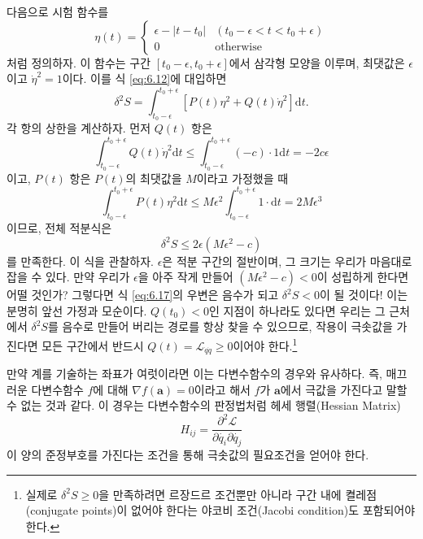 \documentclass[chapter, oneside, b5paper]{oblivoir}
\theoremstyle{plain}
\theoremstyle{definition}
\theoremstyle{remark}
\begin{document}
다음으로 시험 함수를
\begin{equation}
    \eta(t) = \begin{cases}
    \epsilon - |t-t_0| & (t_0 - \epsilon<t<t_0+\epsilon) \\
    0 & \mathrm{otherwise} \end{cases}
\end{equation}
처럼 정의하자. 이 함수는 구간 $[t_0 - \epsilon, t_0 + \epsilon]$에서 삼각형 모양을 이루며, 최댓값은 $\epsilon$이고 $\dot{\eta}^2 = 1$이다. 이를 식 \ref{eq:6.12}에 대입하면
\begin{equation}
    \delta^2 S = \int_{t_0 - \epsilon}^{t_0+\epsilon}[P(t) \eta^2 + Q(t) \dot{\eta}^2] \mathrm{d}t.
\end{equation}
각 항의 상한을 계산하자. 먼저 $Q(t)$ 항은
\begin{equation}
    \int_{t_0 - \epsilon}^{t_0+\epsilon} Q(t)  \dot{\eta}^2 \mathrm{d}t\leq \int_{t_0 - \epsilon}^{t_0+\epsilon} (-c) \cdot 1 \mathrm{d}t = -2c\epsilon
\end{equation}
이고, $P(t)$ 항은 $P(t)$의 최댓값을 $M$이라고 가정했을 때
\begin{equation}
    \int_{t_0 - \epsilon}^{t_0+\epsilon} P(t)  {\eta}^2 \mathrm{d}t\leq M\epsilon^2 \int_{t_0 - \epsilon}^{t_0+\epsilon} 1 \cdot \mathrm{d}t = 2M\epsilon^3
\end{equation}
이므로, 전체 적분식은
\begin{equation}
    \delta^2 S \leq 2\epsilon (M\epsilon^2-c)
    \label{eq:6.17}
\end{equation}
를 만족한다. 이 식을 관찰하자. $\epsilon$은 적분 구간의 절반이며, 그 크기는 우리가 마음대로 잡을 수 있다. 만약 우리가 $\epsilon$을 아주 작게 만들어 $(M\epsilon^2-c) < 0$이 성립하게 한다면 어떨 것인가? 그렇다면 식 \ref{eq:6.17}의 우변은 음수가 되고 $\delta^2S < 0$이 될 것이다! 이는 분명히 앞선 가정과 모순이다. $Q(t_0) < 0$인 지점이 하나라도 있다면 우리는 그 근처에서 $\delta^2 S$를 음수로 만들어 버리는 경로를 항상 찾을 수 있으므로, 작용이 극솟값을 가진다면 모든 구간에서 반드시 $Q(t) = \mathcal{L}_{\dot{q}\dot{q}} \geq 0$이어야 한다.\footnote{실제로 $\delta^2 S \geq  0$을 만족하려면 르장드르 조건뿐만 아니라 구간 내에 켤레점(conjugate points)이 없어야 한다는 야코비 조건(Jacobi condition)도 포함되어야 한다.}

만약 계를 기술하는 좌표가 여럿이라면 이는 다변수함수의 경우와 유사하다. 즉, 매끄러운 다변수함수 $f$에 대해 $\nabla f(\mathbf{a}) = 0$이라고 해서 $f$가 $\mathbf{a}$에서 극값을 가진다고 말할 수 없는 것과 같다. 이 경우는 다변수함수의 판정법처럼 헤세 행렬(Hessian Matrix)
\begin{equation}
    H_{ij} = \frac{\partial^2 \mathcal{L}}{\partial \dot{q_i} \partial{\dot{q_j}}}
\end{equation}
이 양의 준정부호를 가진다는 조건을 통해 극솟값의 필요조건을 얻어야 한다.
\end{document}
